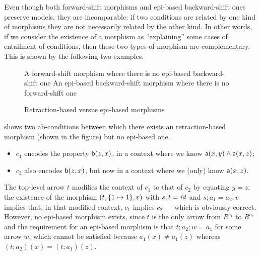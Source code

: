 Even though both forward-shift morphisms and epi-based backward-shift ones preserve models, they are incomparable: if two conditions are related by one kind of morphisms they are not necessarily related by the other kind. In other words, if we consider the existence of a morphism as ``explaining'' some cases of entailment of conditions, then these two types of morphism are complementary. This is shown by the following two examples.
%
\begin{figure}
\centering
\subcaptionbox
  {A forward-shift morphism where there is no epi-based backward-shift one
  }
  {}
  \qquad
\subcaptionbox
  {An epi-based backward-shift morphism where there is no forward-shift one
  }
  {}
\caption{Retraction-based versus epi-based morphisms}
\end{figure}
%
\begin{example}
  shows two ab-conditions between which there exists an retraction-based morphism (shown in the figure) but no epi-based one.
\begin{itemize}
\item $c_1$ encodes the property $\mathsf{b}(z,x)$, in a context where we know $\mathsf{a}(x,y)\wedge \mathsf{a}(x,z)$;
\item $c_2$ also encodes $\mathsf{b}(z,x)$, but now in a context where we (only) know $\mathsf{a}(x,z)$.
\end{itemize}
The top-level arrow $t$ modifies the context of $c_1$ to that of $c_2$ by equating $y=z$; the existence of the morphism $(t,\{{1\mapsto 1}\},v)$ with $s;t=\mathit{id}$ and $s;a_1=a_2;v$ implies that, in that modified context, $c_1$ implies $c_2$ --- which is obviously correct. However, no epi-based morphism exists, since $t$ is the only arrow from $R^{c_1}$ to $R^{c_2}$ and the requirement for an epi-based morphism is that $t;a_2;w=a_1$ for some arrow $w$, which cannot be satisfied because $a_1(x)\neq a_1(z)$ whereas $(t;a_2)(x)=(t;a_1)(z)$.
\end{example}
%
